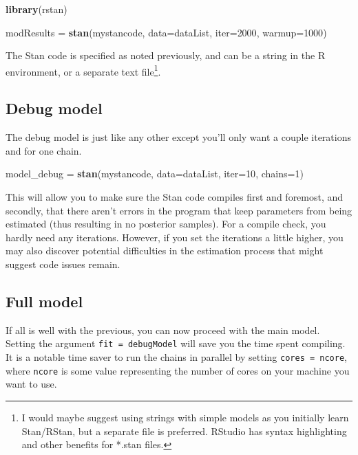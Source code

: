 \documentclass[]{book}
\newenvironment{Shaded}{\begin{snugshade}}{\end{snugshade}}
\newcommand{\KeywordTok}[1]{\textcolor[rgb]{0.13,0.29,0.53}{\textbf{{#1}}}}
\newcommand{\DataTypeTok}[1]{\textcolor[rgb]{0.13,0.29,0.53}{{#1}}}
\newcommand{\DecValTok}[1]{\textcolor[rgb]{0.00,0.00,0.81}{{#1}}}
\newcommand{\StringTok}[1]{\textcolor[rgb]{0.31,0.60,0.02}{{#1}}}
\newcommand{\NormalTok}[1]{{#1}}
\let\rmarkdownfootnote\footnote%
\def\footnote{\protect\rmarkdownfootnote}
\begin{document}
\begin{Shaded}
\begin{Highlighting}[]
\KeywordTok{library}\NormalTok{(rstan)}

\NormalTok{modResults =}\StringTok{ }\KeywordTok{stan}\NormalTok{(mystancode, }\DataTypeTok{data=}\NormalTok{dataList, }\DataTypeTok{iter=}\DecValTok{2000}\NormalTok{, }\DataTypeTok{warmup=}\DecValTok{1000}\NormalTok{)}
\end{Highlighting}
\end{Shaded}

The Stan code is specified as noted previously, and can be a string in
the R environment, or a separate text file\footnote{I would maybe
  suggest using strings with simple models as you initially learn
  Stan/RStan, but a separate file is preferred. RStudio has syntax
  highlighting and other benefits for *.stan files.}.

\subsection{Debug model}\label{debug-model}

The debug model is just like any other except you'll only want a couple
iterations and for one chain.

\begin{Shaded}
\begin{Highlighting}[]
\NormalTok{model_debug =}\StringTok{ }\KeywordTok{stan}\NormalTok{(mystancode, }\DataTypeTok{data=}\NormalTok{dataList, }\DataTypeTok{iter=}\DecValTok{10}\NormalTok{, }\DataTypeTok{chains=}\DecValTok{1}\NormalTok{)}
\end{Highlighting}
\end{Shaded}

This will allow you to make sure the Stan code compiles first and
foremost, and secondly, that there aren't errors in the program that
keep parameters from being estimated (thus resulting in no posterior
samples). For a compile check, you hardly need any iterations. However,
if you set the iterations a little higher, you may also discover
potential difficulties in the estimation process that might suggest code
issues remain.

\subsection{Full model}\label{full-model}

If all is well with the previous, you can now proceed with the main
model. Setting the argument \texttt{fit\ =\ debugModel} will save you
the time spent compiling. It is a notable time saver to run the chains
in parallel by setting \texttt{cores\ =\ ncore}, where \texttt{ncore} is
some value representing the number of cores on your machine you want to
use.
\end{document}
